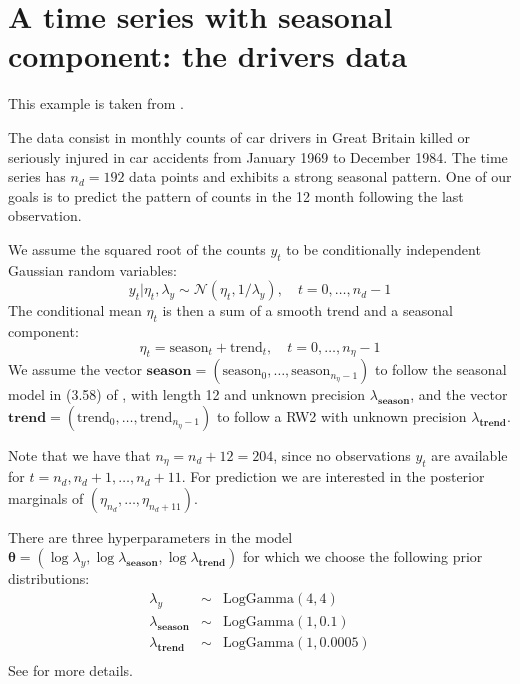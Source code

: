 \documentclass[a4paper,11pt]{article}
\def\mm#1{\ensuremath{\boldsymbol{#1}}} %
\begin{document}


\section*{A time series with seasonal component: the drivers data}
This example is  taken from \cite[Sec 4.4.2]{book80}. 

    The data consist in monthly counts of car drivers in Great Britain
    killed or seriously injured in car accidents from January 1969 to
    December 1984. The time series has $n_d=192$ data points and
    exhibits a strong seasonal pattern. One of our goals is to predict
    the pattern of counts in the 12 month following the last
    observation.

    We assume the squared root of the counts $y_t$ to be conditionally
    independent Gaussian random variables:
    \[
    y_t|\eta_t,\lambda_y\sim\mathcal{N}(\eta_t,1/\lambda_y),\quad
    t=0,\dots,n_d-1
    \]
    The conditional mean $\eta_t$ is then a sum of a smooth trend and
    a seasonal component:
    \begin{equation}
        \eta_t=\text{season}_t+\text{trend}_t,\quad t=0,\dots,n_{\eta}-1
    \end{equation}
    We assume the vector
    $\textbf{season}=(\text{season}_0,\dots,\text{season}_{n_{\eta}-1})$
    to follow the seasonal model in (3.58) of \cite{book80}, with
    length 12 and unknown precision $\lambda_{\textbf{season}}$, and
    the vector
    $\textbf{trend}=(\text{trend}_0,\dots,\text{trend}_{n_{\eta}-1})$
    to follow a RW2 with unknown precision $\lambda_{\textbf{trend}}$.

    Note that we have that $n_{\eta}=n_d+12=204$, since no
    observations $y_t$ are available for
    $t=n_d,n_d+1,\dots,n_d+11$. For prediction we are interested in
    the posterior marginals of $(\eta_{n_d},\dots,\eta_{n_d+11})$.

    There are three hyperparameters in the model
    $\mm{\theta}=(\log\lambda_y,\log\lambda_{\textbf{season}},\log\lambda_{\textbf{trend}})$
    for which we choose the following prior distributions:
    \[
    \begin{array}{lcl}
        \lambda_y&\sim&\text{LogGamma}(4,4)\\
        \lambda_{\textbf{season}}&\sim&\text{LogGamma}(1,0.1)\\
        \lambda_{\textbf{trend}}&\sim&\text{LogGamma}(1,0.0005)\\
    \end{array}
    \]
    See \cite{book80} for more details.

\small \newpage
\end{document}
